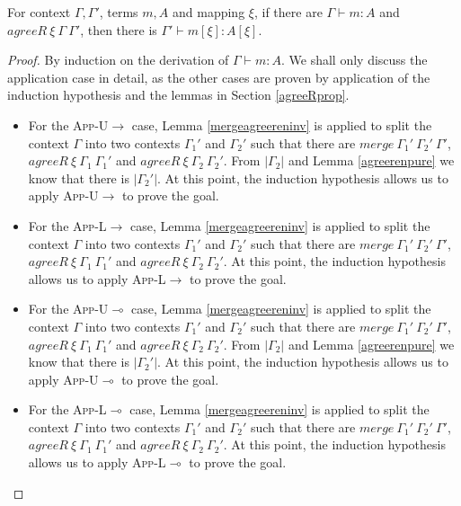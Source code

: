 \documentclass[sigplan,screen,review,anonymous]{acmart}
\newcommand{\rname}[1]{\textsc{\footnotesize #1}}
\newcommand{\pure}[1]{|#1|}
\newcommand{\mrg}[3]{merge\ {#1}\ {#2}\ {#3}}
\begin{document}
\begin{lemma}\label{renaming}
  For context $\Gamma, \Gamma'$, terms $m, A$ and mapping $\xi$, if there are $\Gamma \vdash m : A$ and $agreeR\ \xi\ \Gamma\ \Gamma'$, then there is $\Gamma' \vdash m[\xi] : A[\xi]$.
\end{lemma}
\begin{proof}
  By induction on the derivation of $\Gamma \vdash m : A$. We shall only discuss the application case in detail, as the other cases are proven by application of the induction hypothesis and the lemmas in Section \ref{agreeRprop}.
  \begin{itemize}
    \item For the \rname{App-U$\rightarrow$} case, Lemma \ref{mergeagreereninv} is applied to split the context $\Gamma$ into two contexts $\Gamma_1'$ and $\Gamma_2'$ such that there are $\mrg{\Gamma_1'}{\Gamma_2'}{\Gamma'}$, $agreeR\ \xi\ \Gamma_1\ \Gamma_1'$ and $agreeR\ \xi\ \Gamma_2\ \Gamma_2'$. From $\pure{\Gamma_2}$ and Lemma \ref{agreerenpure} we know that there is $\pure{\Gamma_2'}$. At this point, the induction hypothesis allows us to apply \rname{App-U$\rightarrow$} to prove the goal.
    \item For the \rname{App-L$\rightarrow$} case, Lemma \ref{mergeagreereninv} is applied to split the context $\Gamma$ into two contexts $\Gamma_1'$ and $\Gamma_2'$ such that there are $\mrg{\Gamma_1'}{\Gamma_2'}{\Gamma'}$, $agreeR\ \xi\ \Gamma_1\ \Gamma_1'$ and $agreeR\ \xi\ \Gamma_2\ \Gamma_2'$. At this point, the induction hypothesis allows us to apply \rname{App-L$\rightarrow$} to prove the goal.
    \item For the \rname{App-U$\multimap$} case, Lemma \ref{mergeagreereninv} is applied to split the context $\Gamma$ into two contexts $\Gamma_1'$ and $\Gamma_2'$ such that there are $\mrg{\Gamma_1'}{\Gamma_2'}{\Gamma'}$, $agreeR\ \xi\ \Gamma_1\ \Gamma_1'$ and $agreeR\ \xi\ \Gamma_2\ \Gamma_2'$. From $\pure{\Gamma_2}$ and Lemma \ref{agreerenpure} we know that there is $\pure{\Gamma_2'}$. At this point, the induction hypothesis allows us to apply \rname{App-U$\multimap$} to prove the goal.
    \item For the \rname{App-L$\multimap$} case, Lemma \ref{mergeagreereninv} is applied to split the context $\Gamma$ into two contexts $\Gamma_1'$ and $\Gamma_2'$ such that there are $\mrg{\Gamma_1'}{\Gamma_2'}{\Gamma'}$, $agreeR\ \xi\ \Gamma_1\ \Gamma_1'$ and $agreeR\ \xi\ \Gamma_2\ \Gamma_2'$. At this point, the induction hypothesis allows us to apply \rname{App-L$\multimap$} to prove the goal.
  \end{itemize}
\end{proof}
\end{document}

